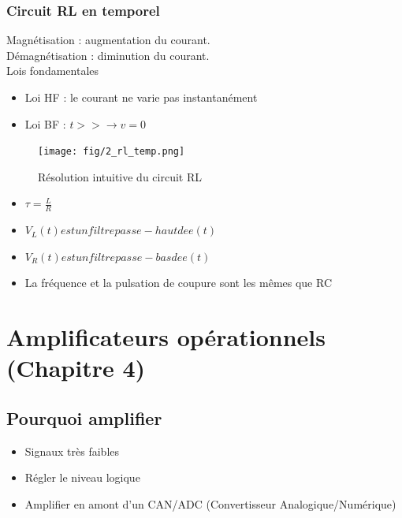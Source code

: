 \documentclass[a4paper]{article}
\begin{document}
        \subsubsection{Circuit RL en temporel}
            Magnétisation : augmentation du courant. \\
            Démagnétisation : diminution du courant. \\
            Lois fondamentales
            \begin{itemize}
                \item Loi HF : le courant ne varie pas instantanément
                \item Loi BF : $ t>> \rightarrow v = 0 $
            \end{itemize}
            \begin{figure}[H]
                \begin{center}
                    \texttt{[image: fig/2\_rl\_temp.png]}
                    \caption{Résolution intuitive du circuit RL}
                    \label{fig:2_superposition}
                \end{center}
            \end{figure}
            \begin{itemize}
                \item $ \tau = \frac{L}{R} $
                \item $ V_{L}(t) est un filtre passe-haut de e(t) $
                \item $ V_{R}(t) est un filtre passe-bas de e(t) $
                \item La fréquence et la pulsation de coupure sont les mêmes que RC
            \end{itemize}


\section{Amplificateurs opérationnels (Chapitre 4)}
    \subsection{Pourquoi amplifier}
        \begin{itemize}
            \item Signaux très faibles
            \item Régler le niveau logique
            \item Amplifier en amont d'un CAN/ADC (Convertisseur Analogique/Numérique)
        \end{itemize}
\end{document}
